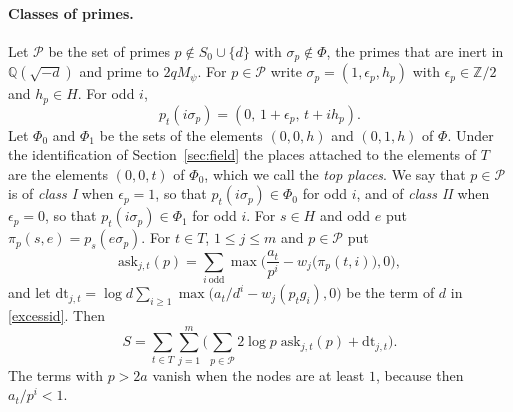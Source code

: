 \paragraph{Classes of primes.} Let $\mathcal P$ be the set of primes $p\notin S_0\cup\{d\}$ with $\sigma_p\notin\Phi$, the primes that are inert in $\mathbb Q(\sqrt{-d})$ and prime to $2qM_\psi$. For $p\in\mathcal P$ write $\sigma_p=(1,\epsilon_p,h_p)$ with $\epsilon_p\in\mathbb Z/2$ and $h_p\in H$. For odd $i$,
\[
p_t(i\sigma_p)=(0,\,1+\epsilon_p,\,t+ih_p).
\]
Let $\Phi_0$ and $\Phi_1$ be the sets of the elements $(0,0,h)$ and $(0,1,h)$ of $\Phi$. Under the identification of Section~\ref{sec:field} the places attached to the elements of $T$ are the elements $(0,0,t)$ of $\Phi_0$, which we call the \emph{top places}. We say that $p\in\mathcal P$ is of \emph{class I} when $\epsilon_p=1$, so that $p_t(i\sigma_p)\in\Phi_0$ for odd $i$, and of \emph{class II} when $\epsilon_p=0$, so that $p_t(i\sigma_p)\in\Phi_1$ for odd $i$. For $s\in H$ and odd $e$ put $\pi_p(s,e)=p_s(e\sigma_p)$. For $t\in T$, $1\le j\le m$ and $p\in\mathcal P$ put
\begin{equation}\label{r2:ask}
\mathrm{ask}_{j,t}(p)=\sum_{i\ \mathrm{odd}}\max\Big(\frac{a_t}{p^i}-w_j\big(\pi_p(t,i)\big),0\Big),
\end{equation}
and let $\mathrm{dt}_{j,t}=\log d\sum_{i\ge1}\max\big(a_t/d^i-w_j(p_tg_i),0\big)$ be the term of $d$ in \eqref{excessid}. Then
\begin{equation}\label{r2:Ssplit}
S=\sum_{t\in T}\sum_{j=1}^m\Big(\sum_{p\in\mathcal P}2\log p\;\mathrm{ask}_{j,t}(p)+\mathrm{dt}_{j,t}\Big).
\end{equation}
The terms with $p>2a$ vanish when the nodes are at least $1$, because then $a_t/p^i<1$.

